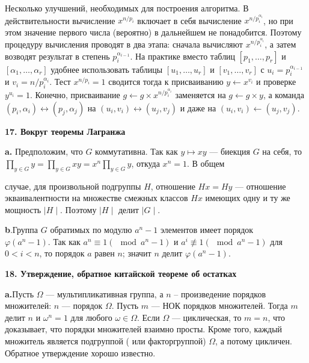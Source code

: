 \documentclass{mai_book}
\begin{document}
Несколько улучшений, необходимых для построения алгоритма. В
действительности вычисление $x^{n/p_i}$ включает в себя вычисление $x^{n/p_i^{\alpha_i}}$,
но при этом значение первого числа (вероятно) в дальнейшем не пона­добится. Поэтому процедуру вычисления проводят в два этапа: снача­ла вычисляют $x^{n/p_i^{\alpha_i}}$, а затем возводят результат в степень $p_i^{\alpha_{i-1}}$. На
практике вместо таблиц $[p_1,\dots,p_r]$ и $[\alpha_1,\dots,\alpha_r]$ удобнее использовать
таблицы $[u_1,\dots,u_r]$ и $[v_1,\dots,v_r]$ с $u_i=p_i^{\alpha_{i-1}}$ и $v_i=n/p_i^{\alpha_i}$. Тест $x^{n/p_i}=1$ сводится тогда к присваиванию $y\longleftarrow x^{v_i}$ и проверке $y^{u_i}=1$. Конечно,
присваивание $g\longleftarrow g\times x^{n/p_i^{\alpha_i}}$ заменяется на $g\longleftarrow g\times y$, а команда
$(p_i, \alpha_i) \longleftrightarrow (p_j,\alpha_j)$ на $(u_i, v_i) \longleftrightarrow (u_j,v_j)$ и даже на $(u_i, v_i) \longleftarrow (u_j,v_j)$.

\bigskip
\textbf{17. Вокруг теоремы Лагранжа}

\medskip
\textbf{a.} Предположим, что $G$ коммутативна. Так как $y\mapsto xy$ --- биекция $G$ на себя, то $\prod_{y\in G}y=\prod_{y\in G}xy=x^n\prod_{y\in G}y$, откуда $x^n=1$. В общем

\newpage


\noindent случае, для произвольной подгруппы $H$, отношение $Hx = Hy$ --- отношение экваивалентности на множестве смежных классов $Hx$ имеющих одну и ту же мощность $\mid H\mid $. Поэтому $\mid H\mid $ делит $\mid G\mid $.

\medskip
\indent\textbf{b}.\quad Группа $G$ обратимых по модулю $a^n - 1$ элементов имеет порядок \\ $\varphi(a^n-1)$. Так как $a^n \equiv 1 ( \mod a^n -1)$ и $ a^i \not\equiv 1 (\mod a^n -1)$ для $0<i<n$, то порядок $a$ равен $n$; значит $n$ делит $\varphi(a^n-1)$.

\bigskip
\noindent\textbf{18. Утверждение, обратное китайской теореме об остатках}

\medskip
\indent \textbf{a.}\quad Пусть $\Omega$ --- мультипликативная группа, а $n$ -- произведение порядков множителей: $n$ --- порядок $\Omega$. Пусть $m$ --- НОК порядков множителей. Тогда $m$ делит $n$ и $\omega^n=1$ для любого $\omega \in \Omega$. Если $\Omega$ --- циклическая, то $m = n$, что доказывает, что порядки множителей взаимно просты. Кроме того, каждый множитель является подгруппой ( или факторгруппой) $\Omega$, а потому цикличен. Обратное утверждение хорошо известно.
\end{document}
